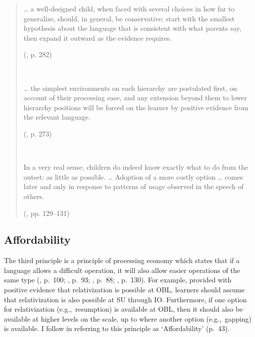 \begin{quote}
\begin{samepage}
\dots{} a well-designed child, when faced with several choices in how far to generalize, should, in general, be conservative: start with the smallest hypothesis about the language that is consistent with what parents say, then expand it outward as the evidence requires.
\par\nobreak\vspace{5pt}
\hfill (\cite{pinker1994}, p. 282)
\end{samepage}\\\vspace{12pt}

\begin{samepage}
\dots{} the simplest environments on each hierarchy are postulated first, on account of their processing ease, and any extension beyond them to lower hierarchy positions will be forced on the learner by positive evidence from the relevant language.
\par\nobreak\vspace{5pt}
\hfill (\cite{hawkins2004}, p. 273)    
\end{samepage}\\\vspace{12pt}

\begin{samepage}
In a very real sense, children do indeed know exactly what to do from the outset: as little as possible. \dots{} Adoption of a more costly option \dots{} comes later and only in response to patterns of usage observed in the speech of others.
\par\nobreak\vspace{5pt}
\hfill (\cite{ogrady2022a}, pp. 129--131)
\end{samepage}
\end{quote}\vspace{-12pt}

\subsection{Affordability}\label{acq-affordability}

The third principle is a principle of processing economy which states that if a language allows a difficult operation, it will also allow easier operations of the same type (\cite{hawkins2004}, p.~100; \cite{huang2000}, p.~93; \cite{keenan.comrie1977}, p.~88; \cite{ogrady2022a}, p.~130). For example, provided with positive evidence that relativization is possible at OBL, learners should assume that relativization is also possible at SU through IO. Furthermore, if one option for relativization (e.g.,~resumption) is available at OBL, then it should also be available at higher levels on the scale, up to where another option (e.g.,~gapping) is available. I follow \textcite{ogrady2022a} in referring to this principle as `Affordability' (p.~43). 

